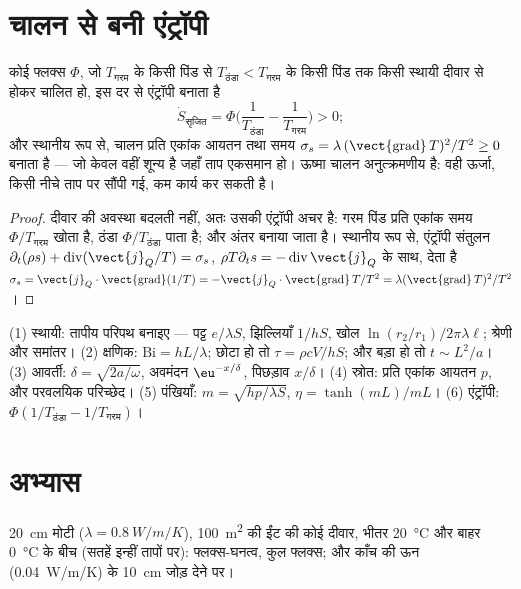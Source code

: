 \section{चालन से बनी एंट्रॉपी}

\begin{proposition}[एंट्रॉपी उत्पादन]\label{prop:b2:heat-conduction:entropy}
कोई फ्लक्स $\Phi$, जो $T_{\text{गरम}}$ के किसी पिंड से
$T_{\text{ठंडा}} < T_{\text{गरम}}$ के किसी पिंड तक किसी स्थायी दीवार से होकर चालित हो, इस
दर से एंट्रॉपी बनाता है
\[
\dot S_{\text{सृजित}} = \Phi\Big(\frac{1}{T_{\text{ठंडा}}} - \frac{1}{T_{\text{गरम}}}\Big) > 0 ;
\]
और स्थानीय रूप से, चालन प्रति एकांक आयतन तथा समय $\sigma_s = \lambda\,(\vect{\operatorname{grad}}\,T)^2/T^2
\ge 0$ बनाता है --- जो केवल वहीं शून्य है जहाँ ताप
एकसमान हो। ऊष्मा चालन अनुत्क्रमणीय है: वही ऊर्जा, किसी नीचे ताप पर
सौंपी गई, कम कार्य कर सकती है।
\end{proposition}

\begin{proof}
दीवार की अवस्था बदलती नहीं, अतः उसकी एंट्रॉपी अचर है: गरम
पिंड प्रति एकांक समय $\Phi/T_{\text{गरम}}$ खोता है, ठंडा
$\Phi/T_{\text{ठंडा}}$ पाता है; और अंतर बनाया जाता है। स्थानीय रूप से, एंट्रॉपी
संतुलन $\partial_t(\rho s) + \operatorname{div}(\vect{j}_Q/T) = \sigma_s$,
$\rho T\partial_t s = -\operatorname{div}\vect{j}_Q$ के साथ, देता है $\sigma_s =
\vect{j}_Q\cdot\vect{\operatorname{grad}}(1/T) = -\vect{j}_Q\cdot
\vect{\operatorname{grad}}\,T/T^2 = \lambda(\vect{\operatorname{grad}}\,T)^2/T^2$।
\end{proof}

\begin{method}[चालन के आकलन]\label{meth:b2:heat-conduction:method}
(1) स्थायी: तापीय परिपथ बनाइए --- पट्ट $e/\lambda S$, झिल्लियाँ
$1/hS$, खोल $\ln(r_2/r_1)/2\pi\lambda\ell$; श्रेणी और समांतर।
(2) क्षणिक: $\mathrm{Bi} = hL/\lambda$; छोटा हो तो $\tau = \rho cV/hS$; और
बड़ा हो तो $t \sim L^2/a$। (3) आवर्ती: $\delta = \sqrt{2a/\omega}$, अवमंदन
$\eu^{-x/\delta}$, पिछड़ाव $x/\delta$। (4) स्रोत: प्रति एकांक आयतन $p$, और परवलयिक
परिच्छेद। (5) पंखियाँ: $m = \sqrt{hp/\lambda S}$, $\eta = \tanh(mL)/mL$। (6)
एंट्रॉपी: $\Phi(1/T_{\text{ठंडा}} - 1/T_{\text{गरम}})$।
\end{method}

\section{अभ्यास}

\begin{exercise}[$\star$]\label{exo:b2:heat-conduction:1}
\qty{20}{cm} मोटी ($\lambda = \qty{0.8}{W/m/K}$), \qty{100}{m^2} की ईंट की कोई दीवार,
भीतर \qty{20}{\celsius} और बाहर \qty{0}{\celsius} के बीच
(सतहें इन्हीं तापों पर): फ्लक्स-घनत्व, कुल फ्लक्स; और
काँच की ऊन (\qty{0.04}{W/m/K}) के \qty{10}{cm} जोड़ देने पर।
\end{exercise}

